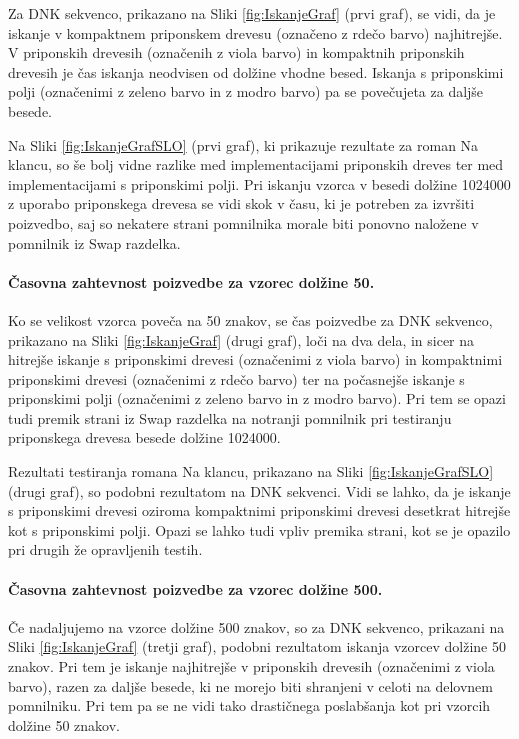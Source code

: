 Za DNK sekvenco, prikazano na Sliki \ref{fig:IskanjeGraf} (prvi graf), se vidi, da je iskanje v kompaktnem priponskem drevesu (označeno z rdečo barvo) najhitrejše. V priponskih drevesih (označenih z viola barvo) in kompaktnih priponskih drevesih je čas iskanja neodvisen od dolžine vhodne besed. Iskanja s priponskimi polji (označenimi z zeleno barvo in z modro barvo) pa se povečujeta za daljše besede.

Na Sliki \ref{fig:IskanjeGrafSLO} (prvi graf), ki prikazuje rezultate za roman Na klancu, so še bolj vidne razlike med implementacijami priponskih dreves ter med implementacijami s priponskimi polji. Pri iskanju vzorca v besedi dolžine 1024000 z uporabo priponskega drevesa se vidi skok v času, ki je potreben za izvršiti poizvedbo, saj so nekatere strani pomnilnika morale biti ponovno naložene v pomnilnik iz Swap razdelka.

\paragraph{Časovna zahtevnost poizvedbe za vzorec dolžine 50.}

Ko se velikost vzorca poveča na 50 znakov, se čas poizvedbe za DNK sekvenco, prikazano na Sliki \ref{fig:IskanjeGraf} (drugi graf), loči na dva dela, in sicer na hitrejše iskanje s priponskimi drevesi (označenimi z viola barvo) in kompaktnimi priponskimi drevesi (označenimi z rdečo barvo) ter na počasnejše iskanje s priponskimi polji (označenimi z zeleno barvo in z modro barvo). Pri tem se opazi tudi premik strani iz Swap razdelka na notranji pomnilnik pri testiranju priponskega drevesa besede dolžine 1024000.

Rezultati testiranja romana Na klancu, prikazano na Sliki \ref{fig:IskanjeGrafSLO} (drugi graf), so podobni rezultatom na DNK sekvenci. Vidi se lahko, da je iskanje s priponskimi drevesi oziroma kompaktnimi priponskimi drevesi desetkrat hitrejše kot s priponskimi polji. Opazi se lahko tudi vpliv premika strani, kot se je opazilo pri drugih že opravljenih testih. 

\paragraph{Časovna zahtevnost poizvedbe za vzorec dolžine 500.}
Če nadaljujemo na vzorce dolžine 500 znakov, so za DNK sekvenco, prikazani na Sliki \ref{fig:IskanjeGraf} (tretji graf), podobni rezultatom iskanja vzorcev dolžine 50 znakov. Pri tem je iskanje najhitrejše v priponskih drevesih (označenimi z viola barvo), razen za daljše besede, ki ne morejo biti shranjeni v celoti na delovnem pomnilniku. Pri tem pa se ne vidi tako drastičnega poslabšanja kot pri vzorcih dolžine 50 znakov.

